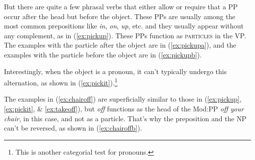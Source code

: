 \ea
    \label{ex:morningcookiesa}
    \label{ex:morningcookiesb}
    \label{ex:morningcookiesd}
    \z\label{ex:morningcookies}
\z

But there are quite a few phrasal verbs that either allow or require that a PP occur after the head but before the object. These PPs are usually among the most common prepositions like \textit{in}, \textit{on}, \textit{up}, etc. and they usually appear without any complement, as in (\ref{ex:pickup}). These PPs function as \textsc{particles} in the VP. The examples with the particle after the object are in (\ref{ex:pickupa}), and the examples with the particle before the object are in (\ref{ex:pickupb}).

\begin{multicols}{2}
\ea \label{ex:pickup}
    \ea \label{ex:pickupa}
    \z
    \ex \label{ex:pickupb}
        \z
    \z
\z
\end{multicols}
Interestingly, when the object is a pronoun, it can't typically undergo this alternation, as shown in (\ref{ex:pickit}).\footnote{This is another categorial test for pronouns.}

\begin{multicols}{2}
\ea \label{ex:pickit}
    \ea
    \z
    \ex
        \z
    \z
\z
\end{multicols}

The examples in (\ref{ex:chairoff}) are superficially similar to those in (\ref{ex:pickup}, \ref{ex:pickit}, \& \ref{ex:takeoff}), but \textit{off} functions as the head of the Mod:PP \textit{off your chair}, in this case, and not as a particle. That's why the preposition and the NP can't be reversed, as shown in (\ref{ex:chairoffb}).

